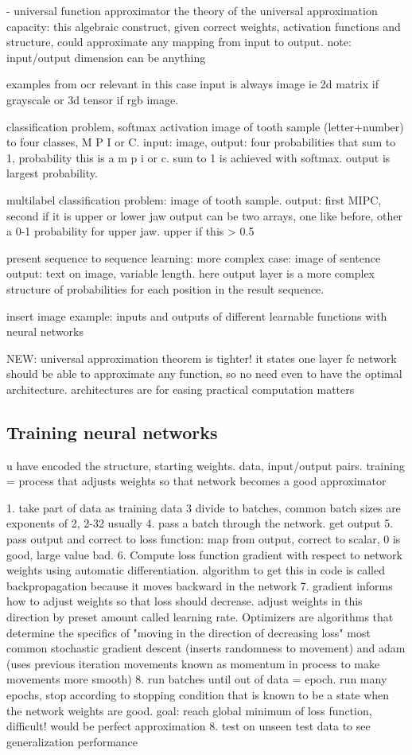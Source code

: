\documentclass{article}
\begin{document}
- universal function approximator
the theory of the universal approximation capacity: this algebraic construct, 
given correct weights, activation functions and structure, could approximate 
any mapping from input to output. note: input/output dimension can be anything

examples from ocr relevant in this case
input is always image ie 2d matrix if grayscale or 3d tensor if rgb image.

classification problem, softmax activation
image of tooth sample (letter+number) to four classes, M P I or C.
input: image, output: four probabilities that sum to 1, probability this is a m
p i or c. sum to 1 is achieved with softmax. output is largest probability.

multilabel classification problem:
image of tooth sample. output: first MIPC, second if it is upper or lower jaw
output can be two arrays, one like before, other a 0-1 probability for upper jaw. upper if this > 0.5 

present sequence to sequence learning:
more complex case: image of sentence
output: text on image, variable length. here output layer is a more complex 
structure of probabilities for each position in the result sequence.

insert image example: inputs and outputs of different learnable functions with neural networks

NEW: universal approximation theorem is tighter! it states one layer fc network should be 
able to approximate any function, so no need even to have the optimal architecture.
architectures are for easing practical computation matters

\subsection{Training neural networks}

u have encoded the structure, starting weights. data, input/output pairs.
training = process that adjusts weights so that network becomes a good 
approximator

1. take part of data as training data
3 divide to batches, common batch sizes are exponents of 2, 2-32 usually 
4. pass a batch through the network. get output 
5. pass output and correct to loss function: map from output, correct to scalar,
0 is good, large value bad.
6. Compute loss function gradient with respect to network weights using automatic differentiation.
algorithm to get this in code is called backpropagation because it moves backward in the network
7. gradient informs how to adjust weights so that loss should decrease. 
adjust weights in this direction by preset amount called learning rate. Optimizers
are algorithms that determine the specifics of "moving in the direction of decreasing loss"
most common stochastic gradient descent (inserts randomness to movement) and 
adam (uses previous iteration movements known as momentum in process to make movements more smooth)
8. run  batches until out of data  = epoch. run many epochs, stop according to 
stopping condition that is known to be a state when the network weights are good.
goal: reach global minimum of loss function, difficult! would be perfect approximation
8. test on unseen test data to see generalization performance
\end{document}
